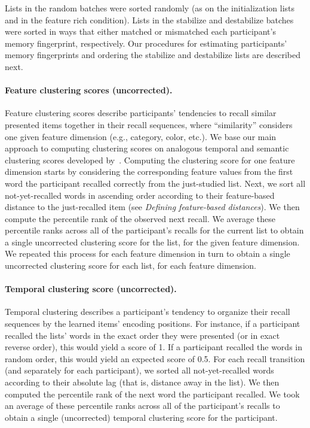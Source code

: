 \documentclass[11pt]{article}
\begin{document}
Lists in the random batches were sorted randomly (as on the initialization
lists and in the feature rich condition). Lists in the stabilize and
destabilize batches were sorted in ways that either matched or mismatched each
participant's memory fingerprint, respectively. Our procedures for estimating
participants' memory fingerprints and ordering the stabilize and destabilize
lists are described next.

\paragraph*{Feature clustering scores (uncorrected).}  

Feature clustering scores describe participants' tendencies to recall similar
presented items together in their recall sequences, where ``similarity''
considers one given feature dimension (e.g., category, color, etc.). We base
our main approach to computing clustering scores on analogous temporal and
semantic clustering scores developed by~\cite{PolyEtal09}. Computing the
clustering score for one feature dimension starts by considering the
corresponding feature values from the first word the participant recalled
correctly from the just-studied list. Next, we sort all not-yet-recalled words
in ascending order according to their feature-based distance to the
just-recalled item (see \textit{Defining feature-based distances}). We then
compute the percentile rank of the observed next recall. We average these
percentile ranks across all of the participant’s recalls for the current list
to obtain a single uncorrected clustering score for the list, for the given
feature dimension. We repeated this process for each feature dimension in turn
to obtain a single uncorrected clustering score for each list, for each feature
dimension.

\paragraph*{Temporal clustering score (uncorrected).}

Temporal clustering describes a participant's tendency to organize their recall
sequences by the learned items' encoding positions. For instance, if a
participant recalled the lists' words in the exact order they were presented
(or in exact reverse order), this would yield a score of 1. If a participant
recalled the words in random order, this would yield an expected score of 0.5.
For each recall transition (and separately for each participant), we sorted all
not-yet-recalled words according to their absolute lag (that is, distance away
in the list). We then computed the percentile rank of the next word the
participant recalled. We took an average of these percentile ranks across all
of the participant’s recalls to obtain a single (uncorrected) temporal
clustering score for the participant.
\end{document}
